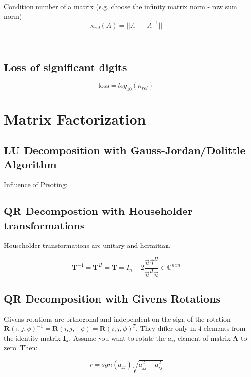 \documentclass[
    a4paper,
    11pt
]{article}
\begin{document}
Condition number of a matrix (e.g. choose the infinity matrix norm - row sum
norm)
\begin{equation}
    \kappa_{rel}(A) = ||A|| \cdot ||A^{-1}||
\end{equation}

\

\subsection{Loss of significant digits}

\begin{equation}
    \text{loss} = log_{10}(\kappa_{rel})
\end{equation}


\section{Matrix Factorization}

\subsection{LU Decomposition with Gauss-Jordan/Dolittle Algorithm}

Influence of Pivoting:

\subsection{QR Decompostion with Householder transformations}

Householder transformations are unitary and hermitian.

\begin{equation}
    \mathbf{T}^{-1} = \mathbf{T}^H = \mathbf{T} = I_n - 2
    \frac{\vec{u}\vec{u}^H}{\vec{u}^H\vec{u}} \in \mathbb{C}^{n x n}
\end{equation}

\subsection{QR Decomposition with Givens Rotations}

Givens rotations are orthogonal and independent on the sign of the
rotation $\mathbf{R}(i,j,\phi)^{-1} = \mathbf{R}(i,j, -\phi) = \mathbf{R}(i,j,
\phi)^{T}$. They differ only in 4 elements from the identity matrix
$\mathbf{I}_n$. Assume you want to rotate the $a_{ij}$ element of matrix
$\mathbf{A}$ to zero. Then:

\begin{equation}
    r = sgn(a_{jj}) \sqrt{a_{jj}^2 + a_{ij}^2}
\end{equation}
\end{document}
